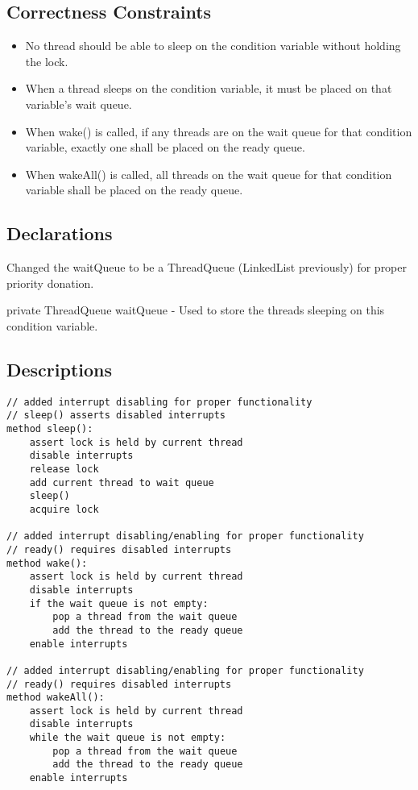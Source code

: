 \documentclass{article}
\begin{document}
\subsection{Correctness Constraints}

\begin{itemize}
\item No thread should be able to sleep on the condition variable without holding the lock.
\item When a thread sleeps on the condition variable, it must be placed on that variable's wait queue.
\item When wake() is called, if any threads are on the wait queue for that condition variable, exactly one shall be placed on the ready queue.
\item When wakeAll() is called, all threads on the wait queue for that condition variable shall be placed on the ready queue.
\end{itemize}

\subsection{Declarations} %

Changed the waitQueue to be a ThreadQueue (LinkedList previously) for proper priority donation.

{\ttfamily private ThreadQueue waitQueue} - Used to store the threads sleeping on this condition variable.

\subsection{Descriptions} %

\scriptsize
\begin{lstlisting}
// added interrupt disabling for proper functionality
// sleep() asserts disabled interrupts
method sleep():
    assert lock is held by current thread
    disable interrupts
    release lock
    add current thread to wait queue
    sleep()
    acquire lock

// added interrupt disabling/enabling for proper functionality
// ready() requires disabled interrupts
method wake():
    assert lock is held by current thread
    disable interrupts
    if the wait queue is not empty:
        pop a thread from the wait queue
        add the thread to the ready queue
    enable interrupts

// added interrupt disabling/enabling for proper functionality
// ready() requires disabled interrupts
method wakeAll():
    assert lock is held by current thread
    disable interrupts
    while the wait queue is not empty:
        pop a thread from the wait queue
        add the thread to the ready queue
    enable interrupts
\end{lstlisting}
\normalsize
\end{document}
